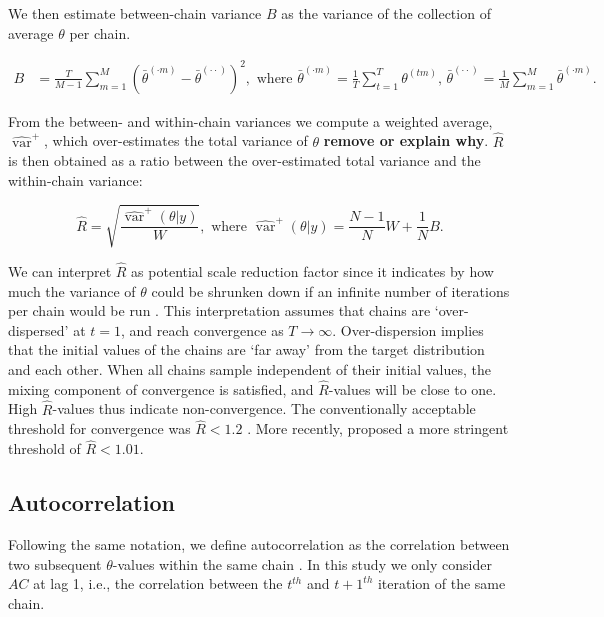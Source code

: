 \documentclass[Royal,times,sageh]{sagej}
\begin{document}
We then estimate between-chain variance \(B\) as the variance of the
collection of average \(\theta\) per chain.

\begin{align*}
B&=\frac{T}{M-1} \sum_{m=1}^{M}\left(\bar{\theta}^{(\cdot m)}-\bar{\theta}^{(\cdot \cdot)}\right)^{2}, \text { where } \bar{\theta}^{(\cdot m)}=\frac{1}{T} \sum_{t=1}^{T} \theta^{(t m)} \text{, } \bar{\theta}^{(\cdot \cdot)}=\frac{1}{M} \sum_{m=1}^{M} \bar{\theta}^{(\cdot m)}. 
\end{align*}

From the between- and within-chain variances we compute a weighted
average, \(\widehat{\operatorname{var}}^{+}\), which over-estimates the
total variance of \(\theta\) \textbf{remove or explain why}.
\(\widehat{R}\) is then obtained as a ratio between the over-estimated
total variance and the within-chain variance:

\begin{equation*}
\widehat{R}=\sqrt{\frac{\widehat{\operatorname{var}}^{+}(\theta | y)}{W}},
\text{ where } \widehat{\operatorname{var}}^{+}(\theta | y)=\frac{N-1}{N} W+\frac{1}{N} B.
\end{equation*}

We can interpret \(\widehat{R}\) as potential scale reduction factor
since it indicates by how much the variance of \(\theta\) could be
shrunken down if an infinite number of iterations per chain would be run
\citep{gelm92}. This interpretation assumes that chains are
`over-dispersed' at \(t=1\), and reach convergence as \(T \to \infty\).
Over-dispersion implies that the initial values of the chains are `far
away' from the target distribution and each other. When all chains
sample independent of their initial values, the mixing component of
convergence is satisfied, and \(\widehat{R}\)-values will be close to
one. High \(\widehat{R}\)-values thus indicate non-convergence. The
conventionally acceptable threshold for convergence was
\(\widehat{R} < 1.2\) \citep{gelm92}. More recently, \citet{veht19}
proposed a more stringent threshold of \(\widehat{R} < 1.01\).

\hypertarget{autocorrelation}{%
\subsection{Autocorrelation}\label{autocorrelation}}

Following the same notation, we define autocorrelation as the
correlation between two subsequent \(\theta\)-values within the same
chain \citep[p.~147]{lync07}. In this study we only consider \(AC\) at
lag 1, i.e., the correlation between the \(t^{th}\) and \(t+1^{th}\)
iteration of the same chain.
\end{document}

